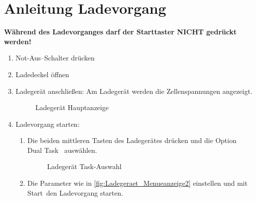 \clearpage
\section{Anleitung Ladevorgang\label{sec:Anleitung_Laden}}
\textbf{Während des Ladevorganges darf der Starttaster NICHT gedrückt werden!}
\begin{enumerate}
    \item Not-Aus--Schalter drücken
    \item Ladedeckel öffnen
    \item Ladegerät anschließen: Am Ladegerät werden die Zellenspannungen angezeigt.
    \begin{figure}[H]
        \centering
        \caption{Ladegerät Hauptanzeige \label{fig:Ladegeraet_Hauptanzeige}}
    \end{figure}
    \newpage
    \item Ladevorgang starten:
    \begin{enumerate}
        \item Die beiden mittleren Tasten des Ladegerätes drücken und die Option \glqq Dual Task \grqq\ auswählen.
        \begin{figure}[H]
            \centering
            \caption{Ladegerät Task-Auswahl \label{fig:Ladegeraet_Menueanzeige}}
        \end{figure}
        \item Die Parameter wie in \autoref{fig:Ladegeraet_Menueanzeige2} einstellen und mit \glqq Start\grqq\ den Ladevorgang starten.

\end{enumerate}
\end{enumerate}
